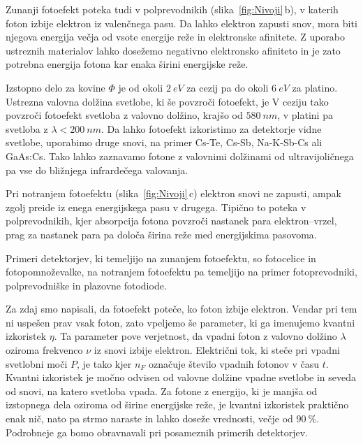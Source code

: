 Zunanji fotoefekt poteka tudi v polprevodnikih (slika~\ref{fig:Nivoji}\,b),
v katerih foton izbije elektron iz valenčnega pasu. Da lahko elektron zapusti snov,
mora biti njegova energija večja od vsote energije reže in elektronske afinitete.
Z uporabo ustreznih materialov lahko dosežemo negativno elektronsko afiniteto
in je zato potrebna energija fotona kar enaka širini energijske reže.

Izstopno delo za kovine $\Phi$ je od okoli $2~\si{eV}$ za cezij pa do okoli 
$6~\si{eV}$ za platino. 
Ustrezna valovna dolžina svetlobe, ki še povzroči fotoefekt, je 
V ceziju tako povzroči fotoefekt svetloba z valovno dolžino, krajšo od $580~\si{nm}$,
v platini pa svetloba z $\lambda < 200~\si{nm}$. 
Da lahko fotoefekt izkoristimo za detektorje vidne svetlobe, 
uporabimo druge snovi, na primer Cs-Te, Cs-Sb, Na-K-Sb-Cs ali GaAs:Cs. 
Tako lahko zaznavamo fotone z valovnimi dolžinami od ultravijoličnega
pa vse do bližnjega infrardečega valovanja.

Pri notranjem fotoefektu (slika~\ref{fig:Nivoji}\,c) elektron 
snovi ne zapusti, ampak zgolj preide iz enega 
energijskega pasu v drugega. Tipično to poteka v polprevodnikih, kjer absorpcija fotona 
povzroči nastanek para elektron--vrzel, prag za nastanek para pa določa širina reže med 
energijskima pasovoma. 

Primeri detektorjev, ki temeljijo na zunanjem fotoefektu, so 
fotocelice in foto\-pomnoževalke, na notranjem fotoefektu pa temeljijo na primer
fotoprevodniki, polprevodniške in plazovne fotodiode.

Za zdaj smo napisali, da fotoefekt poteče, ko foton izbije elektron. Vendar pri tem ni 
uspešen prav vsak foton, zato vpeljemo še parameter, ki ga imenujemo 
kvantni izkoristek $\eta$.
Ta parameter pove verjetnost, da vpadni foton z valovno dolžino $\lambda$ 
oziroma frekvenco $\nu$ iz snovi izbije elektron. 
Električni tok, ki steče pri vpadni svetlobni moči $P$, je tako
kjer $n_F$ označuje število vpadnih fotonov v času $t$. 
Kvantni izkoristek je močno odvisen od valovne dolžine vpadne svetlobe in seveda
od snovi, na katero svetloba vpada. Za fotone z energijo, ki je manjša od izstopnega 
dela oziroma od širine energijske reže, je kvantni izkoristek praktično enak nič, 
nato pa strmo naraste in lahko doseže vrednosti, večje od $90~\%$. Podrobneje ga bomo 
obravnavali pri posameznih primerih detektorjev.

